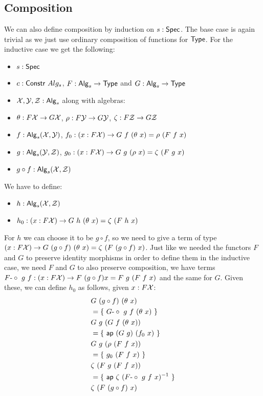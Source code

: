 \documentclass[a4paper,10pt]{report}
\begin{document}
\subsection{Composition}
We can also define composition by induction on $s : \mathsf{Spec}$. The base
case is again trivial as we just use ordinary composition of functions
for $\mathsf{Type}$. For the inductive case we get the following:
%
\begin{itemize}
\item $s : \mathsf{Spec}$ 
\item $c : \mathsf{Constr}\ Alg_s$, \ie $F : \mathsf{Alg}_s \to \mathsf{Type}$ and $G : \mathsf{Alg}_s \to \mathsf{Type}$
\item $\mathcal{X}, \mathcal{Y}, \mathcal{Z} : \mathsf{Alg}_s$ along with algebras:
\item $\theta : F \mathcal{X} \to G \mathcal{X}$, $\rho : F \mathcal{Y} \to G \mathcal{Y}$, $\zeta : F \mathcal{Z} \to G \mathcal{Z}$
\item $f : \mathsf{Alg}_s(\mathcal{X},\mathcal{Y})$, $f_0 : (x : F \mathcal{X}) \to G\ f\ (\theta\ x) = \rho\ (F\ f\ x)$
\item $g : \mathsf{Alg}_s(\mathcal{Y},\mathcal{Z})$, $g_0 : (x : F \mathcal{X}) \to G\ g\ (\rho\ x) = \zeta\ (F\ g\ x)$
\item $g \circ f : \mathsf{Alg}_s(\mathcal{X},\mathcal{Z})$
\end{itemize}
%
We have to define:
%
\begin{itemize}
  \item $h : \mathsf{Alg}_s(\mathcal{X},\mathcal{Z})$
  \item $h_0 : (x : F \alg{X}) \to G\ h\ (\theta\ x) = \zeta\ (F\ h\ x)$
\end{itemize}
%
For $h$ we can choose it to be $g \circ f$, so we need to give a term
of type
$(x : F \mathcal{X}) \to G\ (g \circ f)\ (\theta\ x) = \zeta\ (F\ (g \circ
f)\ x)$.
Just like we needed the functors $F$ and $G$ to preserve identity
morphisms in order to define them in the inductive case, we need $F$
and $G$ to also preserve composition, \ie we have terms
$F\mbox{-}\circ\ g\ f : (x : F \mathcal{X}) \to F\ (g \circ f) x = F\ g\ (F\ f\ x)$ and
the same for $G$. Given these, we can define $h_0$ as follows, given
$x : F \mathcal{X}$:
%
\begin{align*}
  &G\ (g \circ f)\ (\theta\ x) \\
  &= \{\ G\mbox{-}\circ\ g\ f\ (\theta\ x)\ \} \\
  &G\ g\ (G\ f\ (\theta\ x)) \\
  &= \{\ \mathsf{ap}\ (G\ g)\ (f_0\ x)\ \} \\
  &G\ g\ (\rho\ (F\ f\ x)) \\
  &= \{\ g_0\ (F\ f\ x)\ \} \\
  &\zeta\ (F\ g\ (F\ f\ x)) \\
  &= \{\ \mathsf{ap}\ \zeta\ (F\mbox{-}\circ\ g\ f\ x)^{-1}\ \} \\
  &\zeta\ (F\ (g \circ f)\ x)
\end{align*}
\end{document}

